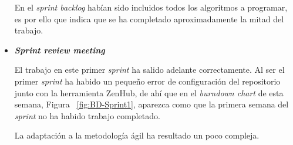 \begin{itemize}
En el \textit{sprint backlog} habían sido incluidos todos los algoritmos a programar, es por ello que indica que se ha completado aproximadamente la mitad del trabajo.

\item \textbf{\textit{Sprint review meeting}}

El trabajo en este primer \textit{sprint} ha salido adelante correctamente. Al ser el primer \textit{sprint} ha habido un pequeño error de configuración del repositorio junto con la herramienta ZenHub, de ahí que en el \textit{burndown chart} de esta semana, Figura ~\ref{fig:BD-Sprint1}, aparezca como que la primera semana del \textit{sprint} no ha habido trabajo completado.

La adaptación a la metodología ágil ha resultado un poco compleja.
\end{itemize}

